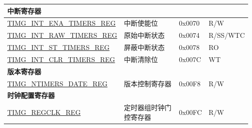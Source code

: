 \begin{longtable}{ | p{6cm} | p{7.2cm} | p{1.3cm} | p{1cm} | }
\multicolumn{4}{|l|}{\textbf{中断寄存器}} \\ \hline
\hyperref[regdesc:TIMGINTENATIMERSREG]{TIMG\_INT\_ENA\_TIMERS\_REG} & 中断使能位 & 0x0070 & R/W \\ \hline
\hyperref[regdesc:TIMGINTRAWTIMERSREG]{TIMG\_INT\_RAW\_TIMERS\_REG} & 原始中断状态 & 0x0074 & R/SS/WTC \\ \hline
\hyperref[regdesc:TIMGINTSTTIMERSREG]{TIMG\_INT\_ST\_TIMERS\_REG} & 屏蔽中断状态 & 0x0078 & RO \\ \hline
\hyperref[regdesc:TIMGINTCLRTIMERSREG]{TIMG\_INT\_CLR\_TIMERS\_REG} & 中断清除位 & 0x007C & WT \\ \hline
\multicolumn{4}{|l|}{\textbf{版本寄存器}} \\ \hline
\hyperref[regdesc:TIMGNTIMERSDATEREG]{TIMG\_NTIMERS\_DATE\_REG} & 版本控制寄存器 & 0x00F8 & R/W \\ \hline
\multicolumn{4}{|l|}{\textbf{时钟配置寄存器}} \\ \hline
\hyperref[regdesc:TIMGREGCLKREG]{TIMG\_REGCLK\_REG} & 定时器组时钟门控寄存器 & 0x00FC & R/W \\ \hline
\end{longtable}
